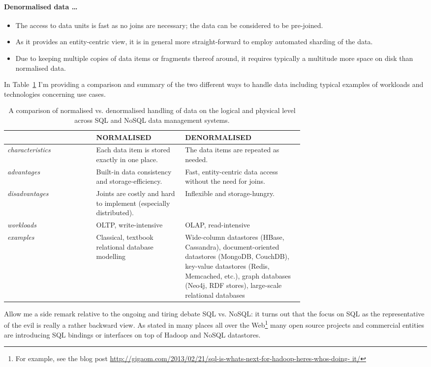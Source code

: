 \documentclass{llncs}
\begin{document}
\paragraph{Denormalised data \ldots} 
\begin{itemize}
	\item The access to data units is fast as no joins are necessary; the
data can be considered to be pre-joined.
	\item As it provides an entity-centric view, it is in general more 
straight-forward to employ automated sharding of the data.
	\item Due to keeping multiple copies of data items or fragments thereof
around, it requires typically a multitude more space on disk than normalised 
data.
\end{itemize}
In Table~\ref{tab:ndcomparison} I'm providing a comparison and summary of the
two different ways to handle data including typical examples of workloads and
technologies concerning use cases.
\begin{center}
\begin{table}
\caption{A comparison of normalised vs. denormalised handling of data on the 
logical and physical level across SQL and NoSQL data management systems.}
\label{tab:ndcomparison}
\begin{tabular}{l @{\hskip 2mm} p{0.30\linewidth} @{\hskip 5mm}
	            p{0.40\linewidth} @{\hskip 2mm}}
& \textbf{NORMALISED}& \textbf{DENORMALISED}\\
\hline
\hline
\emph{characteristics}&
Each data item is stored exactly in one place.&
The data items are repeated as needed.\\
\hline
\emph{advantages}&
Built-in data consistency and storage-efficiency.&
Fast, entity-centric data access without the need for joins.\\
\hline
\emph{disadvantages} &
Joints are costly and hard to implement (especially distributed).&
Inflexible and storage-hungry.\\
\hline
\emph{workloads} &
OLTP, write-intensive&
OLAP, read-intensive\\
\hline
\emph{examples} &
Classical, textbook relational database modelling&
Wide-column datastores (HBase, Cassandra), document-oriented 
datastores (MongoDB, CouchDB), key-value datastores (Redis, Memcached, etc.),
graph databases (Neo4j, RDF stores), large-scale relational databases\\
\hline
\hline
\end{tabular}
\centering
\end{table}
\end{center}
Allow me a side remark relative to the ongoing and tiring debate SQL vs. NoSQL: 
it turns out that the focus on SQL as the representative of the evil is really a
rather backward view. As stated in many places all over the
Web\footnote{For example, see the blog post 
\url{http://gigaom.com/2013/02/21/sql-is-whats-next-for-hadoop-heres-whos-doing-
it/}} many open source projects and commercial entities are introducing SQL
bindings or interfaces on top of Hadoop and NoSQL datastores. 
\end{document}
